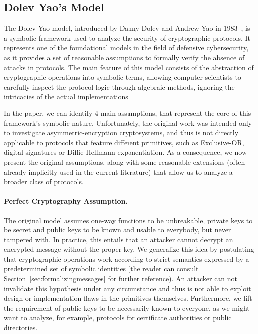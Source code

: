 \subsection{Dolev Yao's Model}
\label{sec:dolevyao}

The Dolev Yao model, introduced by Danny Dolev and Andrew Yao in 1983~\cite{dolevyao}, is a symbolic framework used to analyze the security of cryptographic protocols. It represents one of the foundational models in the field of defensive cybersecurity, as it provides a set of reasonable assumptions to formally verify the absence of attacks in protocols. The main feature of this model consists of the abstraction of cryptographic operations into symbolic terms, allowing computer scientists to carefully inspect the protocol logic through algebraic methods, ignoring the intricacies of the actual implementations.

In the paper, we can identify 4 main assumptions, that represent the core of this framework's symbolic nature. Unfortunately, the original work was intended only to investigate asymmetric-encryption cryptosystems, and thus is not directly applicable to protocols that feature different primitives, such as Exclusive-OR, digital signatures or Diffie-Hellmann exponentiation. As a consequence, we now present the original assumptions, along with some reasonable extensions (often already implicitly used in the current literature) that allow us to analyze a broader class of protocols.

\paragraph{\textbf{Perfect Cryptography Assumption}.} The original model assumes one-way functions to be unbreakable, private keys to be secret and public keys to be known and usable to everybody, but never tampered with. In practice, this entails that an attacker cannot decrypt an encrypted message without the proper key. We generalize this idea by postulating that cryptographic operations work according to strict semantics expressed by a predetermined set of symbolic identities (the reader can consult Section~\ref{sec:formalizingmessages} for further reference). An attacker can not invalidate this hypothesis under any circumstance and thus is not able to exploit design or implementation flaws in the primitives themselves. Furthermore, we lift the requirement of public keys to be necessarily known to everyone, as we might want to analyze, for example, protocols for certificate authorities or public directories.

